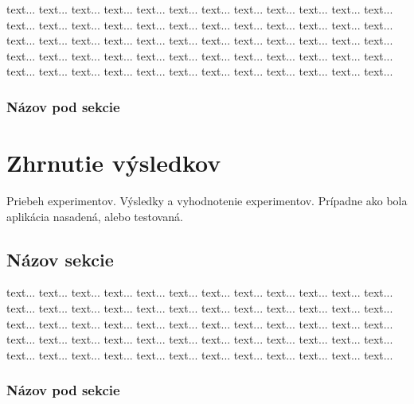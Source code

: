  text...  text...  text...  text...  text...  text...  text...  text...  text...  text...  text...  text...  text...  text...  text...  text...  text...  text...  text...  text...  text...  text...  text...  text...  text...  text...  text...  text...  text...  text...  text...  text...  text...  text...  text...  text...  text...  text...  text...  text...  text...  text...  text...  text...  text...  text...  text...  text...  text...  text...  text...  text...  text...  text...  text...  text...  text...  text...  text...  text...


\subsection{Názov pod sekcie}
\clearpage

\chapter{Zhrnutie výsledkov}

Priebeh experimentov.
Výsledky a vyhodnotenie experimentov.
Prípadne ako bola aplikácia nasadená, alebo testovaná.

\section{Názov sekcie}

 text...  text...  text...  text...  text...  text...  text...  text...  text...  text...  text...  text...  text...  text...  text...  text...  text...  text...  text...  text...  text...  text...  text...  text...  text...  text...  text...  text...  text...  text...  text...  text...  text...  text...  text...  text...  text...  text...  text...  text...  text...  text...  text...  text...  text...  text...  text...  text...  text...  text...  text...  text...  text...  text...  text...  text...  text...  text...  text...  text...


\subsection{Názov pod sekcie}
\clearpage


